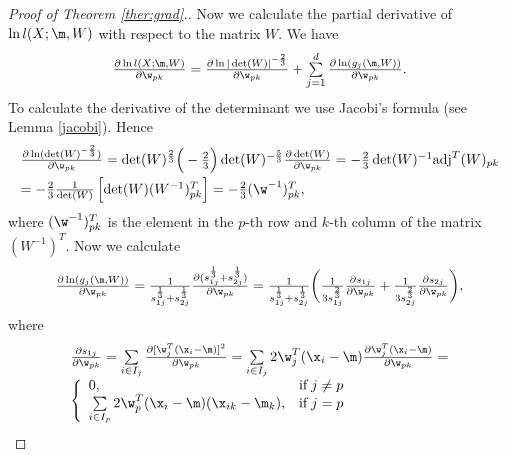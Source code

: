 \begin{proof}[Proof of Theorem \ref{ther:grad}.]
Now we calculate the partial derivative of $\ln {l}(X;\m,W)$ with respect to the matrix $W$. We have
$$
\begin{array}{l}
\frac{\partial \ln {l}(X;\m,W)}{\partial \w_{pk}} = \frac{\partial \ln |\det(W)|^{-\frac{2}{3}}}{\partial \w_{pk}} + \sum\limits_{j=1}^d \frac{\partial \ln ({g}_j(\m,W))}{\partial \w_{pk}}.
\end{array}
$$
To calculate the derivative of the determinant we use Jacobi's formula (see Lemma \ref{jacobi}).
Hence%
$$
\begin{array}{l}
\frac{\partial \ln (\det(W)^{-\frac{2}{3}})}{\partial \w_{pk}} = \det(W)^{\frac{2}{3}}  \Big(-\frac{2}{3}\Big)  \det(W)^{-\frac{5}{3}}  \frac{\partial \det(W)}{\partial \w_{pk}} = -\frac{2}{3} \det(W)^{-1}  \mathrm{adj}^T(W)_{pk} \\[6pt]
 = -\frac{2}{3} \frac{1}{\det(W)}  \left[\det(W)  (W^{-1})^T_{pk}\right]= -\frac{2}{3}  (\w^{-1})^T_{pk},
\end{array}
$$
where $(\w^{-1})^T_{pk}$ is the element in the $p$-th row and $k$-th column of the matrix $(W^{-1})^T$. Now we calculate %
$$
\begin{array}{l}
\frac{\partial \ln ({g}_j(\m,W))}{\partial \w_{pk}} = \frac{1}{{s}_{1j}^{\frac{1}{3}} + {s}_{2j}^{\frac{1}{3}}} \frac{\partial ({s}_{1j}^{\frac{1}{3}} + {s}_{2j}^{\frac{1}{3}})}{\partial \w_{pk}}= \frac{1}{{s}_{1j}^{\frac{1}{3}} + {s}_{2j}^{\frac{1}{3}}} \bigg(
\frac{1}{3 {s}_{1j}^{\frac{2}{3}}}  \frac{\partial {s}_{1j}}{\partial \w_{pk}} +
\frac{1}{3 {s}_{2j}^{\frac{2}{3}}}  \frac{\partial {s}_{2j}}{\partial \w_{pk}}
\bigg),
\end{array}
$$
where
$$
\begin{array}{l}
\frac{\partial {s}_{1j}}{\partial \w_{pk}} = \sum\limits_{ i \in {I}_j} \frac{\partial [\w^T_j (\x_i - \m)]^2}{\partial \w_{pk}} = \sum\limits_{ i \in {I}_j} 2 \w^T_j (\x_i - \m) \frac{\partial \w^T_j (\x_i - \m)}{\partial \w_{pk}}=
\\[6pt]
\left\{ \begin{array}{ll}
0, & \text{if} \; j\neq p\\
\sum\limits_{ i \in {I}_p} 2 \w^T_p (\x_i - \m) (\x_{ik} - \m_k), & \text{if} \; j=p\\
\end{array} \right.
\end{array}
$$

\end{proof}
